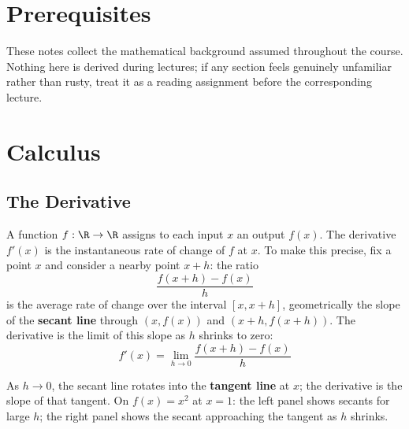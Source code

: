 \documentclass[main.tex]{subfiles}
\begin{document}
\section*{\Huge\textcolor{mantis}{Prerequisites}}
\vspace{0.5cm}

These notes collect the mathematical background assumed throughout the course. Nothing here is derived during lectures; if any section feels genuinely unfamiliar rather than rusty, treat it as a reading assignment before the corresponding lecture.

\needspace{0.33\textheight}
\section{Calculus}

\subsection{The Derivative}

A function $f : \R \to \R$ assigns to each input $x$ an output $f(x)$. The derivative $f'(x)$ is the instantaneous rate of change of $f$ at $x$. To make this precise, fix a point $x$ and consider a nearby point $x + h$: the ratio
$$\frac{f(x+h) - f(x)}{h}$$
is the average rate of change over the interval $[x, x+h]$, geometrically the slope of the \textbf{secant line} through $(x, f(x))$ and $(x+h, f(x+h))$. The derivative is the limit of this slope as $h$ shrinks to zero:
$$f'(x) = \lim_{h \to 0} \frac{f(x+h) - f(x)}{h}$$

As $h \to 0$, the secant line rotates into the \textbf{tangent line} at $x$; the derivative is the slope of that tangent. On $f(x) = x^2$ at $x = 1$: the left panel shows secants for large $h$; the right panel shows the secant approaching the tangent as $h$ shrinks.
\end{document}
